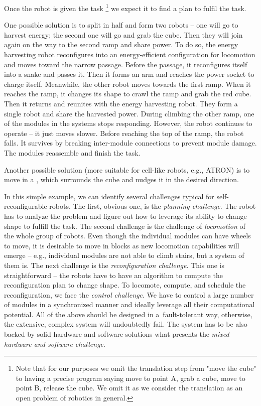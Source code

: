 Once the robot is given the task \footnote{Note that for our purposes we omit
the translation step from "move the cube" to having a precise program saying
move to point A, grab a cube, move to point B, release the cube. We omit it as
we consider the translation as an open problem of robotics in general.} we
expect it to find a plan to fulfil the task.

One possible solution is to split in half and form two robots -- one will go to
harvest energy; the second one will go and grab the cube. Then they will join
again on the way to the second ramp and share power. To do so, the energy
harvesting robot reconfigures into an energy-efficient configuration for
locomotion and moves toward the narrow passage. Before the passage, it
reconfigures itself into a snake and passes it. Then it forms an arm and reaches
the power socket to charge itself. Meanwhile, the other robot moves towards the
first ramp. When it reaches the ramp, it changes its shape to crawl the ramp and
grab the red cube. Then it returns and reunites with the energy harvesting
robot. They form a single robot and share the harvested power. During climbing
the other ramp, one of the modules in the systems stops responding. However, the
robot continues to operate -- it just moves slower. Before reaching the top of
the ramp, the robot falls. It survives by breaking inter-module connections to
prevent module damage. The modules reassemble and finish the task.

Another possible solution (more suitable for cell-like robots, e.g., ATRON) is
to move in a , which surrounds the cube and nudges it
in the desired direction.

In this simple example, we can identify several challenges typical for
self-reconfigurable robots. The first, obvious one, is the \emph{planning
challenge}. The robot has to analyze the problem and figure out how to leverage
its ability to change shape to fulfill the task. The second challenge is the
challenge of \emph{locomotion} of the whole group of robots. Even though the
individual modules can have wheels to move, it is desirable to move in blocks as
new locomotion capabilities will emerge -- e.g., individual modules are not able
to climb stairs, but a system of them is. The next challenge is the
\emph{reconfiguration challenge}. This one is straightforward -- the robots have
to have an algorithm to compute the reconfiguration plan to change shape. To
locomote, compute, and schedule the reconfiguration, we face the \emph{control
challenge}. We have to control a large number of modules in a synchronized
manner and ideally leverage all their computational potential. All of the above
should be designed in a~fault-tolerant way, otherwise, the extensive, complex
system will undoubtedly fail. The system has to be also backed by solid hardware
and software solutions what presents the \emph{mixed hardware and software
challenge}.

